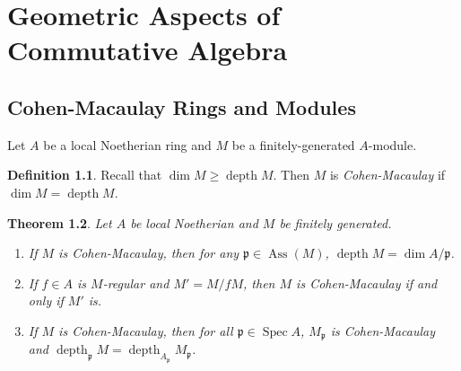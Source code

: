 \documentclass[leqno, openany]{memoir}
\newtheorem{thm}{Theorem}[section]
\theoremstyle{definition}
\newtheorem{defn}[thm]{Definition}
\theoremstyle{remark}
\theoremstyle{plain}
\theoremstyle{definition}
\theoremstyle{remark}
\newcommand{\mf}[1]{\mathfrak{#1}}
\DeclareMathOperator{\Spec}{Spec}
\DeclareMathOperator{\Ass}{Ass}
\DeclareMathOperator{\dpth}{depth}
\begin{document}
\chapter{Geometric Aspects of Commutative Algebra}%
\label{cha:normal_and_regular_rings}

\section{Cohen-Macaulay Rings and Modules}%
\label{sec:cohen_macaulay_rings_and_modules}

Let $A$ be a local Noetherian ring and $M$ be a finitely-generated $A$-module. 

\begin{defn} Recall that $\dim M \geq \dpth M$. Then $M$ is
\textit{Cohen-Macaulay} if $\dim M = \dpth M$.  \end{defn}

\begin{thm} Let $A$ be local Noetherian and $M$ be finitely generated.
    \begin{enumerate} \item If $M$ is Cohen-Macaulay, then for any $\mf{p} \in
        \Ass(M)$, $\dpth M = \dim A/\mf{p}$.  \item If $f \in A$ is $M$-regular
        and $M' = M/fM$, then $M$ is Cohen-Macaulay if and only if $M'$ is.
        \item If $M$ is Cohen-Macaulay, then for all $\mf{p} \in \Spec A$,
    $M_{\mf{p}}$ is Cohen-Macaulay and $\dpth_{\mf{p}} M = \dpth_{A_{\mf{p}}}
    M_{\mf{p}}$.  \end{enumerate} \end{thm}
\end{document}
